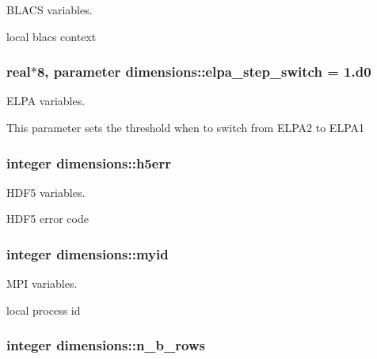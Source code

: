 B\+L\+A\+C\+S variables. 

local blacs context \hypertarget{namespacedimensions_a9ba7a66f9ea734e4a601d9a958e97410}{}
\subsubsection[{elpa\+\_\+step\+\_\+switch}]{\setlength{\rightskip}{0pt plus 5cm}real$\ast$8, parameter dimensions\+::elpa\+\_\+step\+\_\+switch = 1.d0}\label{namespacedimensions_a9ba7a66f9ea734e4a601d9a958e97410}


E\+L\+P\+A variables. 

This parameter sets the threshold when to switch from E\+L\+P\+A2 to E\+L\+P\+A1 \hypertarget{namespacedimensions_a243ee55b5b7e8f7c8bfd83e901331bc3}{}
\subsubsection[{h5err}]{\setlength{\rightskip}{0pt plus 5cm}integer dimensions\+::h5err}\label{namespacedimensions_a243ee55b5b7e8f7c8bfd83e901331bc3}


H\+D\+F5 variables. 

H\+D\+F5 error code \hypertarget{namespacedimensions_a5f4a3aff006de1bb6f79bca467cad6f4}{}
\subsubsection[{myid}]{\setlength{\rightskip}{0pt plus 5cm}integer dimensions\+::myid}\label{namespacedimensions_a5f4a3aff006de1bb6f79bca467cad6f4}


M\+P\+I variables. 

local process id \hypertarget{namespacedimensions_a70149f9e62c94abbe272f7744460e6a7}{}
\subsubsection[{n\+\_\+b\+\_\+rows}]{\setlength{\rightskip}{0pt plus 5cm}integer dimensions\+::n\+\_\+b\+\_\+rows}\label{namespacedimensions_a70149f9e62c94abbe272f7744460e6a7}


